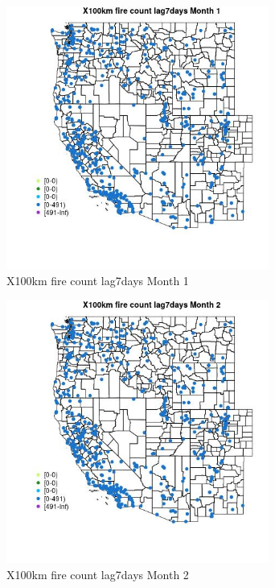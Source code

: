 \begin{figure} 
\centering  
\includegraphics[width=0.77\textwidth]{Code_Outputs/Report_ML_input_PM25_Step4_part_e_de_duplicated_aves_compiled_2019-05-14wNAs_MapObsMo1X100km_fire_count_lag7days.jpg} 
\caption{\label{fig:Report_ML_input_PM25_Step4_part_e_de_duplicated_aves_compiled_2019-05-14wNAsMapObsMo1X100km_fire_count_lag7days}X100km fire count lag7days Month 1} 
\end{figure} 
 

\begin{figure} 
\centering  
\includegraphics[width=0.77\textwidth]{Code_Outputs/Report_ML_input_PM25_Step4_part_e_de_duplicated_aves_compiled_2019-05-14wNAs_MapObsMo2X100km_fire_count_lag7days.jpg} 
\caption{\label{fig:Report_ML_input_PM25_Step4_part_e_de_duplicated_aves_compiled_2019-05-14wNAsMapObsMo2X100km_fire_count_lag7days}X100km fire count lag7days Month 2} 
\end{figure} 
 

